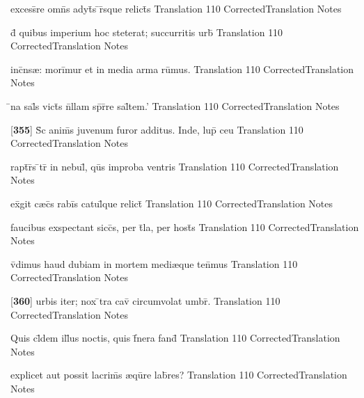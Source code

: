 \latline
  {excess\={}re omn\={}s adyt\={\macron {\i}}s \={}r\={\macron {\i}}sque relict\={\macron {\i}}s}
  { Translation }
  {110}
  { CorrectedTranslation }
  { Notes }


\latline
  {d\={\macron {\i}} quibus imperium hoc steterat; succurritis urb\={\macron {\i}}}
  { Translation }
  {110}
  { CorrectedTranslation }
  { Notes }


\latline
  {inc\={}ns{\ae}: mori\={}mur et in media arma ru\={}mus.}
  { Translation }
  {110}
  { CorrectedTranslation }
  { Notes }


\latline
  {\={}na sal\={}s vict\={\macron {\i}}s n\={}llam sp\={}r\={}re sal\={}tem.'}
  { Translation }
  {110}
  { CorrectedTranslation }
  { Notes }


\latline
  {[\textbf{355}] S\={\macron {\i}}c anim\={\macron {\i}}s juvenum furor additus.  Inde, lup\={\macron {\i}} ceu}
  { Translation }
  {110}
  { CorrectedTranslation }
  { Notes }


\latline
  {rapt\={}r\={}s \={}tr\={} in nebul\={}, qu\={}s improba ventris}
  { Translation }
  {110}
  { CorrectedTranslation }
  { Notes }


\latline
  {ex\={}git c{\ae}c\={}s rabi\={}s catul\={\macron {\i}}que relict\={\macron {\i}}}
  { Translation }
  {110}
  { CorrectedTranslation }
  { Notes }


\latline
  {faucibus exspectant sicc\={\macron {\i}}s, per t\={}la, per host\={\macron {\i}}s}
  { Translation }
  {110}
  { CorrectedTranslation }
  { Notes }


\latline
  {v\={}dimus haud dubiam in mortem medi{\ae}que ten\={}mus}
  { Translation }
  {110}
  { CorrectedTranslation }
  { Notes }


\latline
  {[\textbf{360}] urbis iter; nox \={}tra cav\={} circumvolat umbr\={}.}
  { Translation }
  {110}
  { CorrectedTranslation }
  { Notes }


\latline
  {Quis cl\={}dem ill\={\macron {\i}}us noctis, quis f\={}nera fand\={}}
  { Translation }
  {110}
  { CorrectedTranslation }
  { Notes }


\latline
  {explicet aut possit lacrim\={\macron {\i}}s {\ae}qu\={}re lab\={}res?}
  { Translation }
  {110}
  { CorrectedTranslation }
  { Notes }


